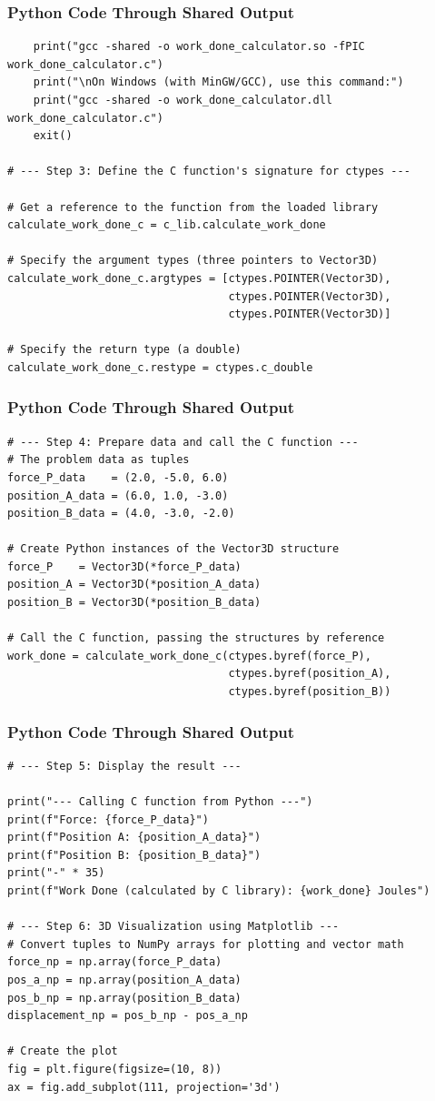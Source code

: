 \documentclass{beamer}
\begin{document}
\begin{frame}[fragile]
\frametitle{Python Code Through Shared Output}
\begin{lstlisting}
    print("gcc -shared -o work_done_calculator.so -fPIC work_done_calculator.c")
    print("\nOn Windows (with MinGW/GCC), use this command:")
    print("gcc -shared -o work_done_calculator.dll work_done_calculator.c")
    exit()

# --- Step 3: Define the C function's signature for ctypes ---

# Get a reference to the function from the loaded library
calculate_work_done_c = c_lib.calculate_work_done

# Specify the argument types (three pointers to Vector3D)
calculate_work_done_c.argtypes = [ctypes.POINTER(Vector3D), 
                                  ctypes.POINTER(Vector3D), 
                                  ctypes.POINTER(Vector3D)]

# Specify the return type (a double)
calculate_work_done_c.restype = ctypes.c_double
\end{lstlisting}
\end{frame}
\begin{frame}[fragile]
\frametitle{Python Code Through Shared Output}
\begin{lstlisting}
# --- Step 4: Prepare data and call the C function ---
# The problem data as tuples
force_P_data    = (2.0, -5.0, 6.0)
position_A_data = (6.0, 1.0, -3.0)
position_B_data = (4.0, -3.0, -2.0)

# Create Python instances of the Vector3D structure
force_P    = Vector3D(*force_P_data)
position_A = Vector3D(*position_A_data)
position_B = Vector3D(*position_B_data)

# Call the C function, passing the structures by reference
work_done = calculate_work_done_c(ctypes.byref(force_P), 
                                  ctypes.byref(position_A), 
                                  ctypes.byref(position_B))
\end{lstlisting}
\end{frame}
\begin{frame}[fragile]
\frametitle{Python Code Through Shared Output}
\begin{lstlisting}
# --- Step 5: Display the result ---

print("--- Calling C function from Python ---")
print(f"Force: {force_P_data}")
print(f"Position A: {position_A_data}")
print(f"Position B: {position_B_data}")
print("-" * 35)
print(f"Work Done (calculated by C library): {work_done} Joules")

# --- Step 6: 3D Visualization using Matplotlib ---
# Convert tuples to NumPy arrays for plotting and vector math
force_np = np.array(force_P_data)
pos_a_np = np.array(position_A_data)
pos_b_np = np.array(position_B_data)
displacement_np = pos_b_np - pos_a_np

# Create the plot
fig = plt.figure(figsize=(10, 8))
ax = fig.add_subplot(111, projection='3d')
\end{lstlisting}
\end{frame}
\end{document}
